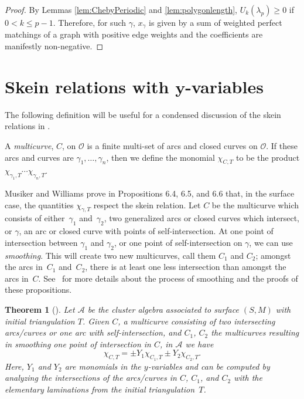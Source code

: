 \documentclass[pdftex]{sigma}%
\numberwithin{equation}{section}
\newtheorem{Theorem}{Theorem}[section]
\begin{document}
\begin{proof}
By Lemmas \ref{lem:ChebyPeriodic} and \ref{lem:polygonlength}, $U_k(\lambda_p) \geq 0$ if $0 < k \leq p-1$. Therefore, for such $\gamma$, $x_\gamma$ is given by a sum of weighted perfect matchings of a graph with positive edge weights and the coefficients are manifestly non-negative.
\end{proof}

\section[Skein relations with $y$-variables]{Skein relations with $\boldsymbol{y}$-variables}\label{sec:Skein}

The following definition will be useful for a condensed discussion of the skein relations in \cite{MW}.

\begin{Definition}
A \emph{multicurve}, $C$, on $\mathcal{O}$ is a finite multi-set of arcs and closed curves on $\mathcal{O}$. If these arcs and curves are $\gamma_1,\ldots, \gamma_n$, then we define the monomial $\chi_{C,T}$ to be the product $\chi_{\gamma_1,T}\cdots \chi_{\gamma_n,T}$.
\end{Definition}


Musiker and Williams \cite{MW} prove in Propositions 6.4, 6.5, and 6.6 that, in the surface case, the quantities $\chi_{\gamma,T}$ respect the skein relation. Let $C$ be the multicurve which consists of either~$\gamma_1$ and~$\gamma_2$, two generalized arcs or closed curves which intersect, or $\gamma$, an arc or closed curve with points of self-intersection. At one point of intersection between $\gamma_1$ and $\gamma_2$, or one point of self-intersection on $\gamma$, we can use \emph{smoothing}. This will create two new multicurves, call them $C_1$ and $C_2$; amongst the arcs in~$C_1$ and~$C_2$, there is at least one less intersection than amongst the arcs in~$C$. See~\cite{MW} for more details about the process of smoothing and the proofs of these propositions.

\begin{Theorem}[{\cite[Propositions 6.4, 6.5, and 6.6]{MW}}]\label{MWSkein}
Let $\mathcal{A}$ be the cluster algebra associated to surface $(S,M)$ with initial triangulation $T$.
Given $C$, a multicurve consisting of two intersecting arcs/curves or one arc with self-intersection, and $C_1$, $C_2$ the multicurves resulting in smoothing one point of intersection in $C$, in $\mathcal{A}$ we have \[
\chi_{C,T} = \pm Y_1 \chi_{C_1,T} \pm Y_2 \chi_{C_2,T}.
\]
Here, $Y_1$ and $Y_2$ are monomials in the $y$-variables and can be computed by analyzing the intersections of the arcs/curves in $C$, $C_1$, and $ C_2$ with the elementary laminations from the initial triangulation~$T$.
\end{Theorem}
\end{document}
